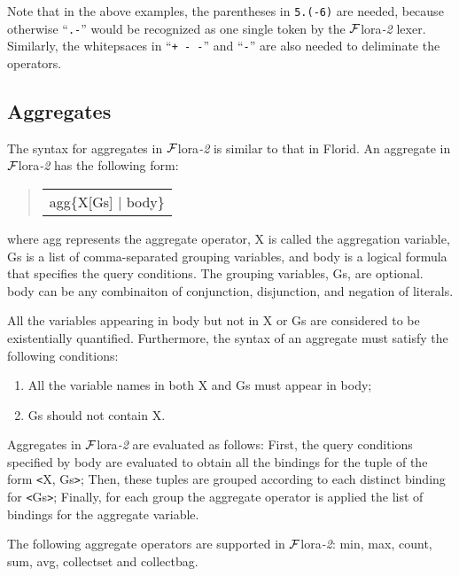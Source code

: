 \documentclass[11pt]{article}
\newenvironment{qrules}{\begin{quote}\sf\begin{tabular}[t]{l}}%
{\end{tabular}\end{quote}}
\newcommand{\FLORA}{{\mbox{${\cal F}${\sc lora}\rm\emph{-2}}}\xspace}
\newcommand{\FLORID}{{\mbox{\sc Florid}}\xspace}
\begin{document}
Note that in the above examples, the parentheses in {\tt 5.(-6)} are needed,
because otherwise ``{\tt .-}'' would be recognized as one single token by
the \FLORA lexer. Similarly, the whitepsaces in \mbox{``{\tt + - -}''} and
\mbox{``{\tt * -}''} are also needed to deliminate the operators.


\subsection{Aggregates}


The syntax for aggregates in \FLORA is similar to that in \FLORID. An
aggregate in \FLORA has the following form:
\begin{qrules}
agg\{X[Gs] $|$ body\}
\end{qrules}
where {\sf agg} represents the aggregate operator, {\sf X} is called the
aggregation variable, {\sf Gs} is a list of comma-separated grouping
variables, and {\sf body} is a logical formula that specifies the
query conditions. The grouping variables, {\sf Gs}, are optional. {\sf body}
can be any combinaiton of conjunction, disjunction, and negation of literals.

All the variables appearing in {\sf body} but not in {\sf X} or {\sf Gs} are
considered to be existentially quantified. Furthermore, the syntax of an
aggregate must satisfy the following conditions:
\begin{enumerate}
\item All the variable names in both {\sf X} and {\sf Gs} must
appear in {\sf body};
\item {\sf Gs} should not contain {\sf X}.
\end{enumerate}

Aggregates in \FLORA are evaluated as follows: First, the query
conditions specified by {\sf body} are evaluated to obtain all the bindings
for the tuple of the form {\sf \texttt{<}X, Gs\texttt{>}}; Then, these
tuples are grouped according to each distinct binding for
{\sf \texttt{<}Gs\texttt{>}}; Finally, for each group the aggregate operator
is applied the list of bindings for the aggregate variable.


The following aggregate operators are supported in \FLORA: {\sf min}, {\sf max},
{\sf count}, {\sf sum}, {\sf avg}, {\sf collectset} and {\sf collectbag}.
\end{document}
